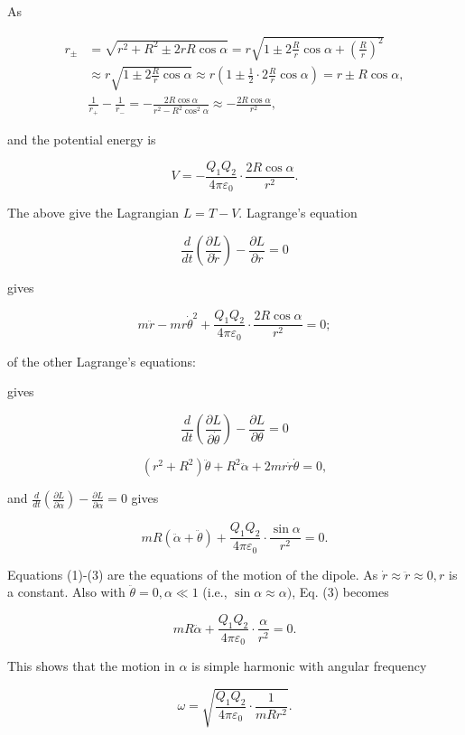 \documentclass[10pt]{article}
\begin{document}
As

$$
\begin{aligned}
r_{\pm} &=\sqrt{r^{2}+R^{2} \pm 2 r R \cos \alpha}=r \sqrt{1 \pm 2 \frac{R}{r} \cos \alpha+\left(\frac{R}{r}\right)^{2}} \\
& \approx r \sqrt{1 \pm 2 \frac{R}{r} \cos \alpha} \approx r\left(1 \pm \frac{1}{2} \cdot 2 \frac{R}{r} \cos \alpha\right)=r \pm R \cos \alpha, \\
& \frac{1}{r_{+}}-\frac{1}{r_{-}}=-\frac{2 R \cos \alpha}{r^{2}-R^{2} \cos ^{2} \alpha} \approx-\frac{2 R \cos \alpha}{r^{2}},
\end{aligned}
$$

and the potential energy is

$$
V=-\frac{Q_{1} Q_{2}}{4 \pi \varepsilon_{0}} \cdot \frac{2 R \cos \alpha}{r^{2}} .
$$

The above give the Lagrangian $L=T-V$. Lagrange's equation

$$
\frac{d}{d t}\left(\frac{\partial L}{\partial \dot{r}}\right)-\frac{\partial L}{\partial r}=0
$$

gives

$$
m \ddot{r}-m r \dot{\theta}^{2}+\frac{Q_{1} Q_{2}}{4 \pi \varepsilon_{0}} \cdot \frac{2 R \cos \alpha}{r^{2}}=0 ;
$$

of the other Lagrange's equations:

gives

$$
\frac{d}{d t}\left(\frac{\partial L}{\partial \dot{\theta}}\right)-\frac{\partial L}{\partial \theta}=0
$$

$$
\left(r^{2}+R^{2}\right) \ddot{\theta}+R^{2} \ddot{\alpha}+2 m r \dot{r} \dot{\theta}=0,
$$

and $\frac{d}{d t}\left(\frac{\partial L}{\partial \dot{\alpha}}\right)-\frac{\partial L}{\partial \alpha}=0$ gives

$$
m R(\ddot{\alpha}+\ddot{\theta})+\frac{Q_{1} Q_{2}}{4 \pi \varepsilon_{0}} \cdot \frac{\sin \alpha}{r^{2}}=0 .
$$

Equations (1)-(3) are the equations of the motion of the dipole.
 As $\dot{r} \approx \ddot{r} \approx 0, r$ is a constant. Also with $\ddot{\theta}=0, \alpha \ll 1$ (i.e., $\sin \alpha \approx \alpha)$, Eq.
(3) becomes

$$
m R \ddot{\alpha}+\frac{Q_{1} Q_{2}}{4 \pi \varepsilon_{0}} \cdot \frac{\alpha}{r^{2}}=0 .
$$

This shows that the motion in $\alpha$ is simple harmonic with angular frequency

$$
\omega=\sqrt{\frac{Q_{1} Q_{2}}{4 \pi \varepsilon_{0}} \cdot \frac{1}{m R r^{2}}} .
$$
\end{document}
